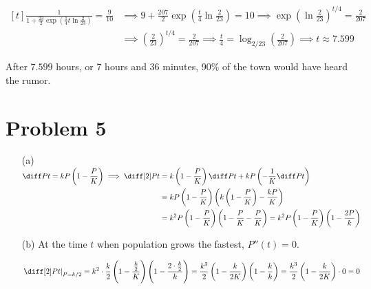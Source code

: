 \documentclass[preview, margin=0.6in]{standalone}
\newcommand*{\problem}[1]{\section*{Problem #1}}
\begin{document}
\begin{itemize}
		$\begin{aligned}[t]
			\frac{1}{1+\frac{23}{2}\exp \left(\frac14t \ln \frac{2}{23}\right)}=\frac{9}{10}
			&\implies 9+\frac{207}{2}\exp \left(\frac t4 \ln \frac{2}{23}\right)=10
			\implies \exp \left(\ln \frac{2}{23}\right)^{t/4}=\frac{2}{207} \\
			&\implies \left(\frac{2}{23}\right)^{t/4}=\frac{2}{207}
			\implies \frac{t}{4}=\log_{2/23}\left(\frac{2}{207}\right)
			\implies t\approx 7.599
		\end{aligned}$

		After $7.599$ hours, or 7 hours and 36 minutes, 90\% of the town would have heard the rumor.
\end{itemize}

\problem{5}
\begin{itemize}
	\item[(a)]
		$\begin{aligned}[t]
		    \diff Pt=kP \left(1-\frac PK\right)
			&\implies \begin{aligned}[t]
				\diff[2] Pt&=k \left(1-\frac PK\right) \diff Pt+kP \left(-\frac1K\diff Pt\right) \\
				&=kP \left(1-\frac PK\right)\left(k \left(1-\frac PK\right)-\frac{kP}{K}\right) \\
				&=k^2P \left(1-\frac PK\right) \left(1-\frac PK-\frac PK\right)
				=k^2P \left(1-\frac PK\right)\left(1-\frac{2P}{k}\right)
			\end{aligned}
		\end{aligned}$

	\item[(b)]
		At the time $t$ when population grows the fastest, $P''(t)=0$.

		$\begin{aligned}[t]
			\left.\diff[2] Pt\right|_{P=k/2}^{}
			&=k^2\cdot\frac k2 \left(1-\frac {\frac k2}K\right)\left(1-\frac{2\cdot\frac k2}{k}\right)
			=\frac{k^3}{2}\left(1-\frac{k}{2K}\right)\left(1-\frac{k}{k}\right)
			=\frac{k^3}{2}\left(1-\frac{k}{2K}\right)\cdot0
			=0
		\end{aligned}$
\end{itemize}
\end{document}
